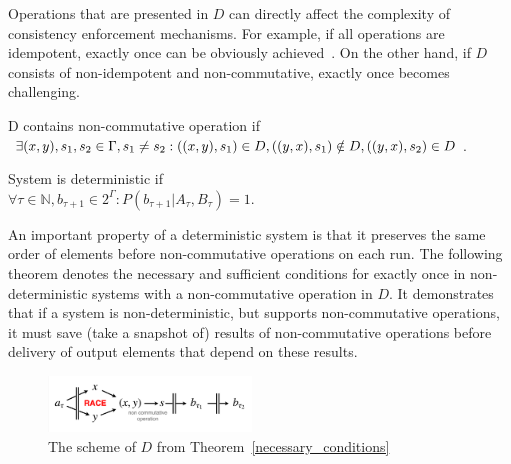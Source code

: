 Operations that are presented in $D$ can directly affect the complexity of consistency enforcement mechanisms. For example, if all operations are idempotent, exactly once can be obviously achieved~\cite{Akidau:2013:MFS:2536222.2536229}. On the other hand, if $D$ consists of non-idempotent and non-commutative, exactly once becomes challenging.

\begin{definition}{D contains non-commutative operation}
if\\ 
$\exists (x,y), s_1, s_2 \in \Gamma, s_1 \neq s_2: \\ ((x,y),s_1)\in D, \\ ((y,x),s_1)\notin D, \\ ((y,x),s_2)\in D$.
\end{definition}

\begin{definition}{System is deterministic}
if\\ 
$\forall{\tau\in{\mathbb{N}}, b_{\tau+1}\in{2^{\Gamma}}}:P(b_{\tau+1}|A_{\tau},B_\tau)=1$.
\end{definition}

An important property of a deterministic system is that it preserves the same order of elements before non-commutative operations on each run. The following theorem denotes the necessary and sufficient conditions for exactly once in non-deterministic systems with a non-commutative operation in $D$. It demonstrates that if a system is non-deterministic, but supports non-commutative operations, it must save (take a snapshot of) results of non-commutative operations before delivery of output elements that depend on these results.

\begin{figure}[htbp]
  \centering
  \includegraphics[width=0.48\textwidth]{pics/theorem-pic}
  \caption{The scheme of $D$ from Theorem~\ref{necessary_conditions}}
  \label {theorem-pic}
\end{figure}

